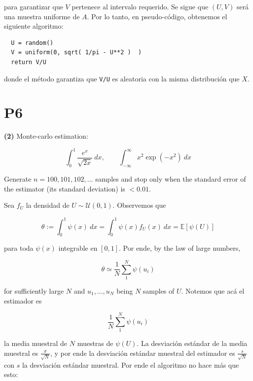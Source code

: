 \documentclass[a4paper, 12pt]{article}
\begin{document}
para garantizar que $V$ pertenece al intervalo requerido. Se sigue que $(U, V)$
será una muestra uniforme de $A$. Por lo tanto, en pseudo-código, obtenemos el
siguiente algoritmo:

\begin{verbatim}
  U = random()
  V = uniform(0, sqrt( 1/pi - U**2 )  )
  return V/U
\end{verbatim}

donde el método garantiza que \texttt{V/U} es aleatoria con la misma
distribución que $X$.



\pagebreak
\section{P6}

\begin{myframe}
    \textbf{(2)} Monte-carlo estimation:

    \begin{equation*}
        \int_0^1 \frac{e^x}{\sqrt{2x} } ~ dx, \qquad \int_{-\infty}^\infty
        x^2\exp(-x^2) ~ dx
    \end{equation*}

    Generate $n = 100, 101, 102, \ldots$ samples and stop only when the standard
    error of the estimator (its standard deviation) is $< 0.01$.
\end{myframe}

Sea $f_U$ la densidad de $U \sim \mathcal{U}(0, 1)$. Observemos que 

\begin{equation*}
    \theta := \int_0^1 \psi(x) ~ dx = \int_0^1 \psi(x) f_U(x) ~ dx =
    \mathbb{E}\left[ \psi(U) \right] 
\end{equation*}

para toda $\psi(x)$ integrable en $[0, 1]$. Por ende, by the law of large
numbers,

\begin{equation*}
    \theta \simeq \frac{1}{N} \sum_{1}^N \psi(u_i)
\end{equation*}

for sufficiently large $N$ and $u_1, \ldots, u_N$ being $N$ samples of $U$.
Notemos que acá el estimador es 

\begin{equation*}
    \frac{1}{N} \sum_{1}^N \psi(u_i)
\end{equation*}

la media muestral de $N$ muestras de $\psi(U)$. La desviación estándar de la
media muestral es $\frac{\sigma}{\sqrt{N} }$, y por ende la desviación estándar
muestral del estimador es $\frac{s}{\sqrt{N} }$ con $s$ la desviación estándar
muestral. Por ende el algoritmo no hace más que esto:
\end{document}
